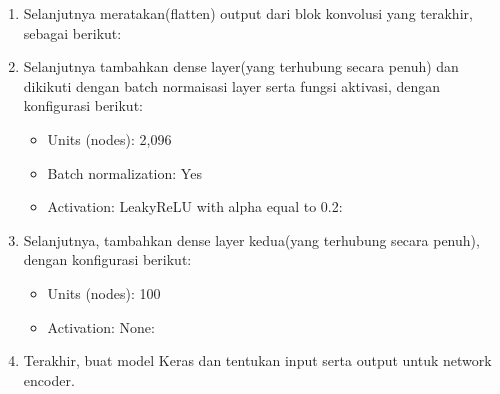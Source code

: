 \begin{enumerate}
\item Selanjutnya meratakan(flatten) output dari blok konvolusi yang terakhir, sebagai berikut:


\item Selanjutnya tambahkan dense layer(yang terhubung secara penuh) dan dikikuti dengan batch normaisasi layer serta fungsi aktivasi, dengan konfigurasi berikut:
	\begin{itemize}
		\item Units (nodes): 2,096
		\item Batch normalization: Yes
		\item Activation: LeakyReLU with alpha equal to 0.2:
	\end{itemize}


\item Selanjutnya, tambahkan dense layer kedua(yang terhubung secara penuh), dengan konfigurasi berikut:
	\begin{itemize}
		\item Units (nodes): 100
		\item Activation: None:
	\end{itemize}

	
\item Terakhir, buat model Keras dan tentukan input serta output untuk network encoder.

\end{enumerate}

